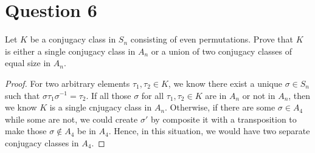\section{Question 6}

\begin{question}
    Let $K$ be a conjugacy class in $S_n$ consisting of even permutations. Prove that $K$ is either a single conjugacy class in $A_n$ or a union of two conjugacy classes of equal size in $A_n$.
\end{question}

\begin{answer}
    \begin{proof}
        For two arbitrary elements $\tau_1,\tau_2 \in K$, we know there exist a unique $\sigma \in S_n$ such that $\sigma \tau_1 \sigma^{-1} = \tau_2$. If all those $\sigma$ for all $\tau_1,\tau_2 \in K$ are in $A_n$ or not in $A_n$, then we know $K$ is a single cnjugacy class in $A_n$. Otherwise, if there are some $\sigma \in A_4$ while some are not, we could create $\sigma'$ by composite it with a transposition to make those $\sigma \notin A_4$ be in $A_4$. Hence, in this situation, we would have two separate conjugacy classes in $A_4$.
    \end{proof}
\end{answer}